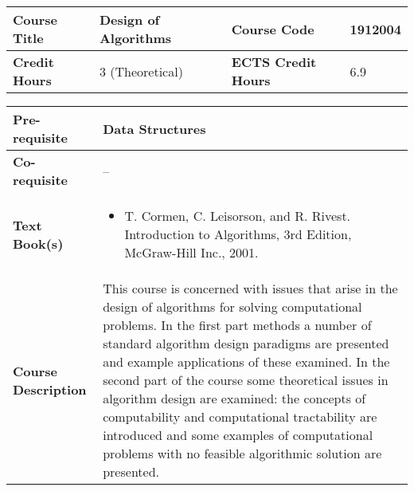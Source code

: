 \documentclass[12pt]{article}
\begin{document}
\begin{minipage}{\textwidth}
\begin{tabularx}{\textwidth}{|l|X|l|X|}
\hline
\textbf{Course Title}       &   Design of Algorithms & \textbf{Course Code}       &  1912004 \\ \hline
\textbf{Credit Hours}       &  3  (Theoretical) & \textbf{ECTS Credit Hours}       &  6.9 \\ \hline
\end{tabularx}

\begin{tabularx}{\textwidth}{|l|X|}
\hline
\textbf{Pre-requisite}      &   Data Structures \\ \hline
\textbf{Co-requisite}       &  -- \\ \hline
\textbf{Text Book(s)}      & \begin{minipage}{.70\textwidth}
					\begin{itemize} \itemsep-0.4em
						\vspace{3mm}
						\item T. Cormen, C. Leisorson, and R. Rivest. Introduction to Algorithms, 3rd Edition, McGraw-Hill Inc., 2001.
						\vspace{3mm}
					\end{itemize}
				\end{minipage}  \\ \hline
\textbf{Course Description} & \begin{minipage}{.70\textwidth}
					\vspace{3mm}
					This course is concerned with issues that arise in the design of algorithms for solving computational problems.
					In the first part methods a number of standard algorithm design paradigms are presented and example applications of these examined.
					In the second part of the course some theoretical issues in algorithm design are examined: the concepts of computability and computational tractability
					are introduced and some examples of computational problems with no feasible algorithmic solution are presented.

					\vspace{3mm}
					\end{minipage} \\ \hline
\end{tabularx}
\end{minipage}


\bigskip
\bigskip
\end{document}
